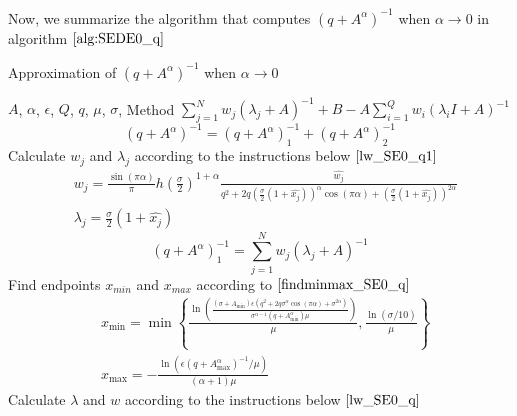 Now, we summarize the algorithm that computes $(q+A^{\alpha})^{-1}$ when $\alpha \rightarrow 0$ in algorithm $\ref{alg:SEDE0_q}$
\begin{breakablealgorithm}
	\caption{Approximation of $(q+A^{\alpha})^{-1}$ when $\alpha \rightarrow 0$}
	\label{alg:SEDE0_q}
	\renewcommand{\algorithmicrequire}{\textbf{Input:}}
	\renewcommand{\algorithmicensure}{\textbf{Output:}}
	\begin{algorithmic}[1]
		\REQUIRE $A$, $\alpha$, $\epsilon$, $Q$, $q$, $\mu$, $\sigma$, Method %
		\ENSURE $\sum_{j=1}^{N}{w_j}(\lambda_j+A)^{-1}+B-A\sum_{i=1}^{Q} w_i(\lambda_i I+ A)^{-1}$    %
		\STATE  {}
		\begin{equation}
		(q+A^{\alpha})^{-1}=(q+A^{\alpha})^{-1}_1+(q+A^{\alpha})^{-1}_2
		\end{equation} 
		\STATE Calculate ${w_j}$ and $\lambda_j$ according to the instructions below $\eqref{lw_SE0_q1}$
		\begin{equation*}
			\begin{aligned}
				& w_j=\frac{\sin(\pi\alpha)}{\pi}h(\frac{\sigma}{2})^{1+\alpha}\frac{\hat{w_j}}{q^2+2q\left(\frac{\sigma}{2}(1+\hat{x_j})\right)^{\alpha}\cos(\pi\alpha)+\left(\frac{\sigma}{2}(1+\hat{x_j})\right)^{2\alpha}}\\
				& \lambda_j=\frac{\sigma}{2}(1+\hat{x_j})
			\end{aligned}
		\end{equation*}		
		\STATE {}
		\begin{equation}
			(q+A^{\alpha})^{-1}_1=\sum_{j=1}^{N}{w_j}(\lambda_j+A)^{-1}
		\end{equation}
		\STATE  Find endpoints $x_{min}$ and $x_{max}$ according to $\eqref{findminmax_SE0_q}$
		\begin{equation*}
			\begin{aligned}
				&x_{\min}= \min \left\{\frac{\ln\left(\frac{(\sigma+A_{\min})\epsilon(q^2+2q\sigma^{\alpha}\cos(\pi\alpha)+\sigma^{2\alpha})}{\sigma^{\alpha-1}(q+A_{\min}^{\alpha})\mu}\right)}{\mu},\frac{\ln(\sigma/10)}{\mu}\right\}\\
				&x_{\max}=-\frac{\ln(\epsilon (q+A_{\max}^{\alpha})^{-1}/\mu)}{(\alpha+1)\mu}
			\end{aligned}
		\end{equation*}
		\STATE  Calculate $\lambda$ and $w$ according to the instructions below $\eqref{lw_SE0_q}$\\

\end{algorithmic}
\end{breakablealgorithm}

